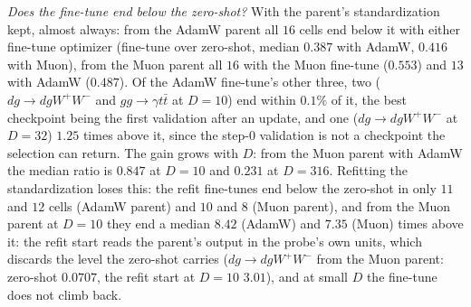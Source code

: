 \documentclass[11pt]{article}
\begin{document}
\begin{itemize}
    \emph{Does the fine-tune end below the zero-shot?} With the parent's standardization kept, almost always: from
    the AdamW parent all $16$ cells end below it with either fine-tune optimizer (fine-tune over zero-shot, median
    $0.387$ with AdamW, $0.416$ with Muon), from the Muon parent all $16$ with the Muon fine-tune ($0.553$) and $13$
    with AdamW ($0.487$). Of the AdamW fine-tune's other three, two ($dg\to dgW^+W^-$ and $gg\to\gamma t\bar t$ at
    $D=10$) end within $0.1\%$ of it, the best checkpoint being the first validation after an update, and one ($dg\to dgW^+W^-$ at
    $D=32$) $1.25$ times above it, since the step-$0$ validation is not a checkpoint the selection can return. The
    gain grows with $D$: from the Muon parent with AdamW the median ratio is $0.847$ at $D=10$ and $0.231$ at
    $D=316$. Refitting the standardization loses this: the refit fine-tunes end below the zero-shot in only $11$ and
    $12$ cells (AdamW parent) and $10$ and $8$ (Muon parent), and from the Muon parent at $D=10$ they end a median
    $8.42$ (AdamW) and $7.35$ (Muon) times above it: the refit start reads the parent's output in the probe's own
    units, which discards the level the zero-shot carries ($dg\to dgW^+W^-$ from the Muon parent: zero-shot $0.0707$,
    the refit start at $D=10$ $3.01$), and at small $D$ the fine-tune does not climb back.

\end{itemize}
\end{document}
